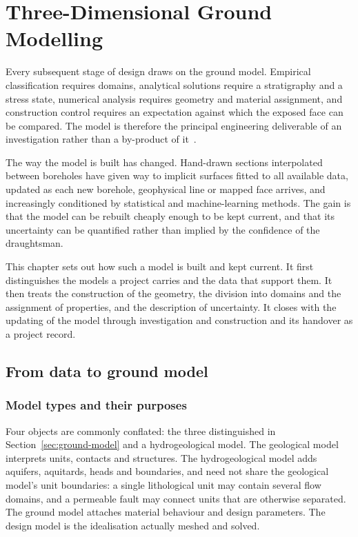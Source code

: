 \chapter{Three-Dimensional Ground Modelling}
\label{ch:ground-modelling}

Every subsequent stage of design draws on the ground model.
Empirical classification requires domains, analytical solutions require a
stratigraphy and a stress state, numerical analysis requires geometry and
material assignment, and construction control requires an expectation against
which the exposed face can be compared. The model is therefore the principal
engineering deliverable of an investigation rather than a by-product of
it~\citep{knill2003ground}.

The way the model is built has changed. Hand-drawn sections interpolated
between boreholes have given way to implicit surfaces fitted to all available
data, updated as each new borehole, geophysical line or mapped face arrives,
and increasingly conditioned by statistical and machine-learning methods. The
gain is that the model can be rebuilt cheaply
enough to be kept current, and that its uncertainty can be quantified rather
than implied by the confidence of the draughtsman.

This chapter sets out how such a model is built and kept current. It first
distinguishes the models a project carries and the data that support them. It
then treats the construction of the geometry, the division into domains and
the assignment of properties, and the description of uncertainty. It closes
with the updating of the model through investigation and construction and its
handover as a project record.

\section{From data to ground model}
\label{sec:data-to-ground-model}

\subsection{Model types and their purposes}
\label{sec:model-types}

Four objects are commonly conflated: the three distinguished in
Section~\ref{sec:ground-model} and a hydrogeological model. The geological model interprets units,
contacts and structures. The hydrogeological model adds aquifers, aquitards,
heads and boundaries, and need not share the geological model's unit
boundaries: a single lithological unit may contain several flow domains,
and a permeable fault may connect units that are otherwise separated. The
ground model attaches material behaviour and design parameters.
The design model is the idealisation actually meshed and solved.


